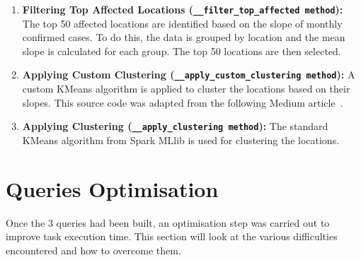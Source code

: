 \documentclass[12pt,oneside]{book} %
\begin{document}
\begin{enumerate}
    \item \textbf{Filtering Top Affected Locations (\texttt{\_\_filter\_top\_affected method}):} The top 50 affected locations are identified based on the slope of monthly confirmed cases. To do this, the data is grouped by location and the mean slope is calculated for each group. The top 50 locations are then selected.

    \item \textbf{Applying Custom Clustering (\texttt{\_\_apply\_custom\_clustering method}):} A custom KMeans algorithm is applied to cluster the locations based on their slopes. This source code was adapted from the following Medium article~\cite{KMeansCustom}.

    \item \textbf{Applying Clustering (\texttt{\_\_apply\_clustering method}):} The standard KMeans algorithm from Spark MLlib is used for clustering the locations.
\end{enumerate}

\newpage

\section{Queries Optimisation}
Once the 3 queries had been built, an optimisation step was carried out to
improve task execution time. This section will look at the various difficulties
encountered and how to overcome them.
\end{document}
